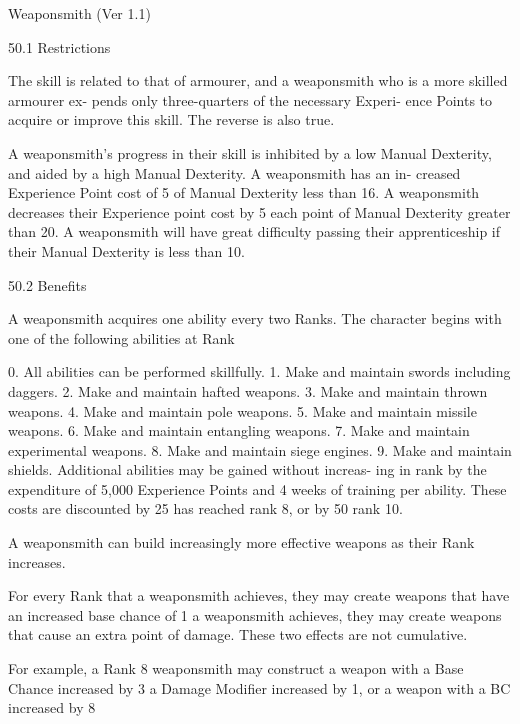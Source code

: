\begin{Chapter}{Weaponsmith (Ver 1.1)}

50.1 Restrictions 

The  skill  is  related  to  that  of  armourer,  and  a 
weaponsmith  who  is  a  more  skilled  armourer  ex-
pends  only  three-quarters  of  the  necessary  Experi-
ence  Points  to  acquire  or  improve  this  skill.  The 
reverse is also true. 

A weaponsmith’s progress in their skill is inhibited 
by  a  low  Manual  Dexterity,  and  aided  by  a  high 
Manual  Dexterity.  A  weaponsmith  has  an  in-
creased Experience Point cost of 5%
of  Manual  Dexterity  less  than  16.  A  weaponsmith 
decreases  their  Experience  point  cost  by  5%
each point of Manual Dexterity  greater  than 20. A 
weaponsmith  will  have  great  difficulty  passing 
their  apprenticeship  if  their  Manual  Dexterity  is 
less than 10. 

50.2 Benefits 

A  weaponsmith  acquires  one  ability  every  two 
Ranks.  The  character  begins  with  one  of  the 
following abilities at Rank 

0.   All abilities can be performed skillfully. 
1.   Make and maintain swords including daggers. 
2.   Make and maintain hafted weapons. 
3.   Make and maintain thrown weapons. 
4.   Make and maintain pole weapons. 
5.   Make and maintain missile weapons. 
6.   Make and maintain entangling weapons. 
7.   Make and maintain experimental weapons. 
8.   Make and maintain siege engines. 
9.   Make and maintain shields. 
Additional abilities may be gained without increas-
ing in rank by the expenditure of 5,000 Experience 
Points  and  4  weeks  of  training  per  ability.  These 
costs  are  discounted  by  25%
has reached rank 8, or by 50%
rank 10. 

A  weaponsmith  can  build  increasingly  more 
effective weapons as their Rank increases. 

For every Rank that a weaponsmith achieves, they 
may  create  weapons  that  have  an  increased  base 
chance of 1%
a weaponsmith achieves, they may create weapons 
that  cause  an  extra  point  of  damage.  These  two 
effects are not cumulative. 

For example, a Rank 8 weaponsmith may construct 
a weapon with a Base Chance increased by 3%
a  Damage  Modifier  increased  by  1,  or  a  weapon 
with a BC increased by 8%


\end{Chapter}
